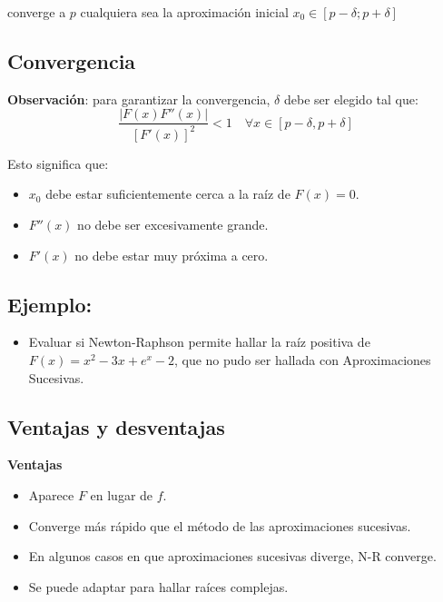 \documentclass[]{book}
\providecommand{\tightlist}{%
  \setlength{\itemsep}{0pt}\setlength{\parskip}{0pt}}
\begin{document}
converge a \(p\) cualquiera sea la aproximación inicial \(x_0 \in [p - \delta; p + \delta]\)

\hypertarget{convergencia}{%
\subsection{Convergencia}\label{convergencia}}

\textbf{Observación}: para garantizar la convergencia, \(\delta\) debe ser elegido tal que:
\[\frac{|F(x)F''(x)|}{[F'(x)]^2} < 1  \quad \forall x \in [p - \delta, p + \delta]\]

Esto significa que:

\begin{itemize}
\tightlist
\item
  \(x_0\) debe estar suficientemente cerca a la raíz de \(F(x) = 0\).
\item
  \(F''(x)\) no debe ser excesivamente grande.
\item
  \(F'(x)\) no debe estar muy próxima a cero.
\end{itemize}

\hypertarget{ejemplo-6}{%
\subsection{Ejemplo:}\label{ejemplo-6}}

\begin{itemize}
\tightlist
\item
  Evaluar si Newton-Raphson permite hallar la raíz positiva de \(F(x) = x^2-3x+e^x-2\), que no pudo ser hallada con Aproximaciones Sucesivas.
\end{itemize}

\hypertarget{ventajas-y-desventajas}{%
\subsection{Ventajas y desventajas}\label{ventajas-y-desventajas}}

\textbf{Ventajas}

\begin{itemize}
\tightlist
\item
  Aparece \(F\) en lugar de \(f\).
\item
  Converge más rápido que el método de las aproximaciones sucesivas.
\item
  En algunos casos en que aproximaciones sucesivas diverge, N-R converge.
\item
  Se puede adaptar para hallar raíces complejas.
\end{itemize}
\end{document}
